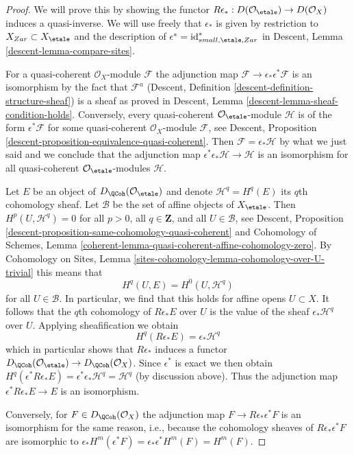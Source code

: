 \begin{proof}
We will prove this by showing the functor
$R\epsilon_* : D(\mathcal{O}_\etale) \to D(\mathcal{O}_X)$
induces a quasi-inverse. We will use freely that $\epsilon_*$
is given by restriction to $X_{Zar} \subset X_\etale$ and the description of
$\epsilon^* = \text{id}_{small, \etale, Zar}^*$
in Descent, Lemma \ref{descent-lemma-compare-sites}.

\medskip\noindent
For a quasi-coherent $\mathcal{O}_X$-module $\mathcal{F}$ the adjunction map
$\mathcal{F} \to \epsilon_*\epsilon^*\mathcal{F}$ is an isomorphism by
the fact that $\mathcal{F}^a$
(Descent, Definition \ref{descent-definition-structure-sheaf})
is a sheaf as proved in
Descent, Lemma \ref{descent-lemma-sheaf-condition-holds}.
Conversely, every quasi-coherent $\mathcal{O}_\etale$-module
$\mathcal{H}$ is of the form $\epsilon^*\mathcal{F}$ for some quasi-coherent
$\mathcal{O}_X$-module $\mathcal{F}$, see
Descent, Proposition \ref{descent-proposition-equivalence-quasi-coherent}.
Then $\mathcal{F} = \epsilon_*\mathcal{H}$ by what we just said and
we conclude that the adjunction map
$\epsilon^*\epsilon_*\mathcal{H} \to \mathcal{H}$ is an isomorphism for all
quasi-coherent $\mathcal{O}_\etale$-modules $\mathcal{H}$.

\medskip\noindent
Let $E$ be an object of $D_\QCoh(\mathcal{O}_\etale)$
and denote $\mathcal{H}^q = H^q(E)$ its $q$th cohomology
sheaf. Let $\mathcal{B}$ be the set of affine objects of $X_\etale$.
Then $H^p(U, \mathcal{H}^q) = 0$ for all $p > 0$, all $q \in \mathbf{Z}$,
and all $U \in \mathcal{B}$, see
Descent, Proposition \ref{descent-proposition-same-cohomology-quasi-coherent}
and
Cohomology of Schemes, Lemma
\ref{coherent-lemma-quasi-coherent-affine-cohomology-zero}.
By Cohomology on Sites, Lemma
\ref{sites-cohomology-lemma-cohomology-over-U-trivial}
this means that
$$
H^q(U, E) = H^0(U, \mathcal{H}^q)
$$
for all $U \in \mathcal{B}$. In particular, we find that this holds
for affine opens $U \subset X$. It follows that the $q$th cohomology of
$R\epsilon_*E$ over $U$ is the value of the sheaf $\epsilon_*\mathcal{H}^q$
over $U$. Applying sheafification we obtain
$$
H^q(R\epsilon_*E) = \epsilon_*\mathcal{H}^q
$$
which in particular shows that $R\epsilon_*$ induces a functor
$D_\QCoh(\mathcal{O}_\etale) \to D_\QCoh(\mathcal{O}_X)$.
Since $\epsilon^*$ is exact we then obtain
$H^q(\epsilon^*R\epsilon_*E) = \epsilon^*\epsilon_*\mathcal{H}^q =
\mathcal{H}^q$ (by discussion above). Thus the adjunction map
$\epsilon^*R\epsilon_*E \to E$ is an isomorphism.

\medskip\noindent
Conversely, for $F \in D_\QCoh(\mathcal{O}_X)$ the
adjunction map $F \to R\epsilon_*\epsilon^*F$
is an isomorphism for the same reason, i.e., because
the cohomology sheaves of $R\epsilon_*\epsilon^*F$
are isomorphic to
$\epsilon_*H^m(\epsilon^*F) = \epsilon_*\epsilon^*H^m(F) = H^m(F)$.
\end{proof}










